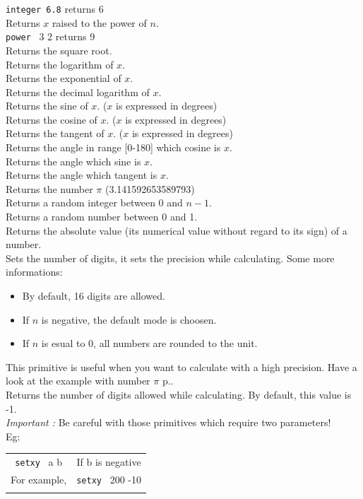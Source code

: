  \texttt{integer 6.8}  returns 6\\
 Returns $x$ raised to the power of $n$.\\
 \texttt{power} \ 3 2 returns 9\\
Returns the square root.\\
 Returns the logarithm of $x$.\\
 Returns the exponential of $x$.\\
 Returns the decimal logarithm of $x$.\\
 Returns the sine of $x$. ($x$ is expressed in degrees)\\
Returns the cosine of $x$. ($x$ is expressed in degrees)\\
Returns the tangent of $x$. ($x$ is expressed in degrees)\\
Returns the angle in range [0-180] which cosine is $x$.\\
Returns the angle which sine is $x$.\\
Returns the angle which tangent is $x$.\\
 Returns the number $\pi$ (3.141592653589793)\\
Returns a random integer between 0 and $n-1$.  \\
Returns a random number between 0 and 1.  \\
 Returns the absolute value (its numerical value without regard to its sign) of a number.  \\
Sets the number of digits, it sets the precision while calculating. Some more informations:\\
\begin{itemize}
 \item By default, 16 digits are allowed.
 \item If $n$ is negative, the default mode is choosen. 
 \item If $n$ is esual to 0, all numbers are rounded to the unit.
\end{itemize}
This primitive is useful when you want to calculate with a high precision. Have a look at the example with number $\pi$ p.\pageref{approx-pi}.\\
Returns the number of digits allowed while calculating. By default, this value is -1.\\
\emph{Important :} Be careful with those primitives which require two parameters! \\
Eg: \begin{tabular}{cc}
 \texttt{setxy} \ a b &
 If b is negative\\
 For example, &
 \texttt{setxy} \ 200 -10\\
\\
\end{tabular}


